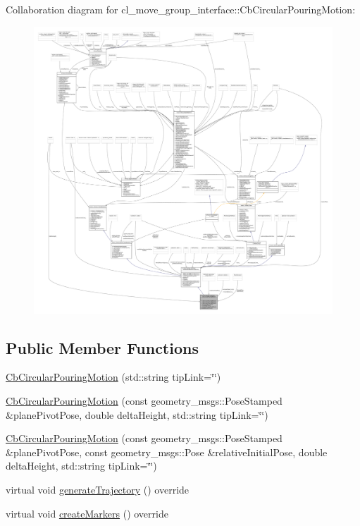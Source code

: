 Collaboration diagram for cl\+\_\+move\+\_\+group\+\_\+interface\+:\+:Cb\+Circular\+Pouring\+Motion\+:
\nopagebreak
\begin{figure}[H]
\begin{center}
\leavevmode
\includegraphics[width=350pt]{classcl__move__group__interface_1_1CbCircularPouringMotion__coll__graph}
\end{center}
\end{figure}
\subsection*{Public Member Functions}
\begin{DoxyCompactItemize}
\item 
\hyperlink{classcl__move__group__interface_1_1CbCircularPouringMotion_a4cd0be54e68f5c25d837064a2369f1a1}{Cb\+Circular\+Pouring\+Motion} (std\+::string tip\+Link=\char`\"{}\char`\"{})
\item 
\hyperlink{classcl__move__group__interface_1_1CbCircularPouringMotion_a1cc07fa14aa37639cf08bfc783a6a91f}{Cb\+Circular\+Pouring\+Motion} (const geometry\+\_\+msgs\+::\+Pose\+Stamped \&plane\+Pivot\+Pose, double delta\+Height, std\+::string tip\+Link=\char`\"{}\char`\"{})
\item 
\hyperlink{classcl__move__group__interface_1_1CbCircularPouringMotion_a6ee291bffe6f492730db93e20be240d1}{Cb\+Circular\+Pouring\+Motion} (const geometry\+\_\+msgs\+::\+Pose\+Stamped \&plane\+Pivot\+Pose, const geometry\+\_\+msgs\+::\+Pose \&relative\+Initial\+Pose, double delta\+Height, std\+::string tip\+Link=\char`\"{}\char`\"{})
\item 
virtual void \hyperlink{classcl__move__group__interface_1_1CbCircularPouringMotion_a9150bb3731082aad3af2d7d6e067a344}{generate\+Trajectory} () override
\item 
virtual void \hyperlink{classcl__move__group__interface_1_1CbCircularPouringMotion_a26d603b1d9bdbf5b71da6c1c4af2c322}{create\+Markers} () override
\end{DoxyCompactItemize}
